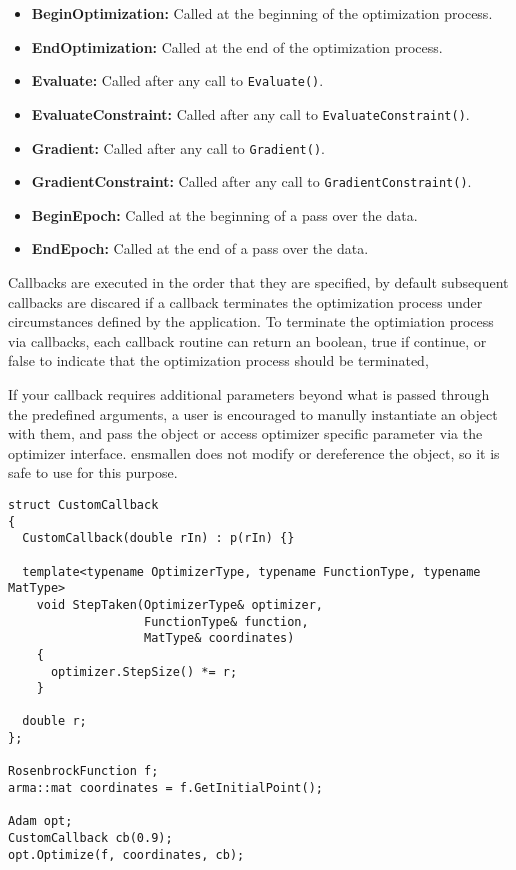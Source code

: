 \begin{itemize}
\item {\bf BeginOptimization:} Called at the beginning of the optimization process.

\item {\bf EndOptimization:} Called at the end of the optimization process.

\item {\bf Evaluate:} Called after any call to {\tt Evaluate()}.

\item {\bf EvaluateConstraint:} Called after any call to {\tt EvaluateConstraint()}.

\item {\bf Gradient:} Called after any call to {\tt Gradient()}.

\item {\bf GradientConstraint:} Called after any call to {\tt GradientConstraint()}.

\item {\bf BeginEpoch:} Called at the beginning of a pass over the data.

\item {\bf EndEpoch:} Called at the end of a pass over the data.
\end{itemize}

Callbacks are executed in the order that they are specified, by default
subsequent callbacks are discared if a callback terminates the optimization
process under circumstances defined by the application. To terminate the
optimiation process via callbacks, each callback routine can return an boolean,
true if continue, or false to indicate that the optimization process should be
terminated,

If your callback requires additional parameters beyond what is passed through
the predefined arguments, a user is encouraged to manully instantiate an object
with them, and pass the object or access optimizer specific parameter via the
optimizer interface. ensmallen does not modify or dereference the object, so it
is safe to use for this purpose.

\begin{verbatim}
struct CustomCallback
{
  CustomCallback(double rIn) : p(rIn) {}

  template<typename OptimizerType, typename FunctionType, typename MatType>
    void StepTaken(OptimizerType& optimizer,
                   FunctionType& function,
                   MatType& coordinates)
    {
      optimizer.StepSize() *= r;
    }

  double r;
};

RosenbrockFunction f;
arma::mat coordinates = f.GetInitialPoint();

Adam opt;
CustomCallback cb(0.9);
opt.Optimize(f, coordinates, cb);
\end{verbatim}

